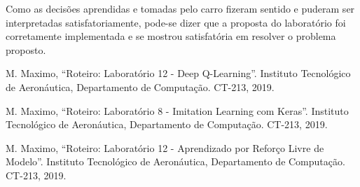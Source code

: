 \documentclass[conference]{IEEEtran}
\begin{document}
Como as decisões aprendidas e tomadas pelo carro fizeram sentido e puderam ser interpretadas satisfatoriamente, pode-se dizer que a proposta do laboratório foi corretamente implementada e se mostrou satisfatória em resolver o problema proposto.
	
\begin{thebibliography}{00}
 M. Maximo, ``Roteiro: Laboratório 12 - Deep Q-Learning''. Instituto Tecnológico de Aeronáutica, Departamento de Computação. CT-213, 2019.

 M. Maximo, ``Roteiro: Laboratório 8 - Imitation Learning com Keras''. Instituto Tecnológico de Aeronáutica, Departamento de Computação. CT-213, 2019.

 M. Maximo, ``Roteiro: Laboratório 12 - Aprendizado por Reforço Livre de Modelo''. Instituto Tecnológico de Aeronáutica, Departamento de Computação. CT-213, 2019.

\end{thebibliography}
\end{document}
